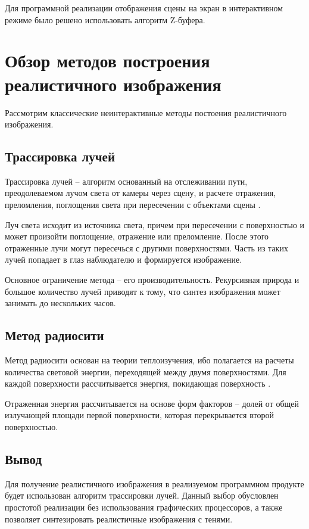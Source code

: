 Для программной реализации отображения сцены на экран в интерактивном режиме было решено использовать алгоритм Z-буфера.

\section{Обзор методов построения реалистичного изображения}

Рассмотрим классические неинтерактивные методы постоения реалистичного изображения.

\subsection{Трассировка лучей}

Трассировка лучей -- алгоритм основанный на отслеживании пути, преодолеваемом лучом света от камеры через сцену, и расчете отражения, преломления, поглощения света при пересечении с объектами сцены \cite{ray-tracing}.

Луч света исходит из источника света, причем при пересечении с поверхностью и может произойти поглощение, отражение или преломление. После этого отраженные лучи могут пересечься с другими поверхностями. Часть из таких лучей попадает в глаз наблюдателю и формируется изображение.

Основное ограничение метода -- его производительность. Рекурсивная природа и большое количество лучей приводят к тому, что синтез изображения может занимать до нескольких часов.

\subsection{Метод радиосити}

Метод радиосити основан на теории теплоизучения, ибо полагается на расчеты количества световой энергии, переходящей между двумя поверхностями. Для каждой поверхности рассчитывается энергия, покидающая поверхность \cite{radiocity}.

Отраженная энергия рассчитывается на основе форм факторов -- долей от общей излучающей площади первой поверхности, которая перекрывается второй поверхностью.

\subsection{Вывод}

Для получение реалистичного изображения в реализуемом программном продукте будет использован алгоритм трассировки лучей. Данный выбор обусловлен простотой реализации без использования графических процессоров, а также позволяет синтезировать реалистичные изображения с тенями.
